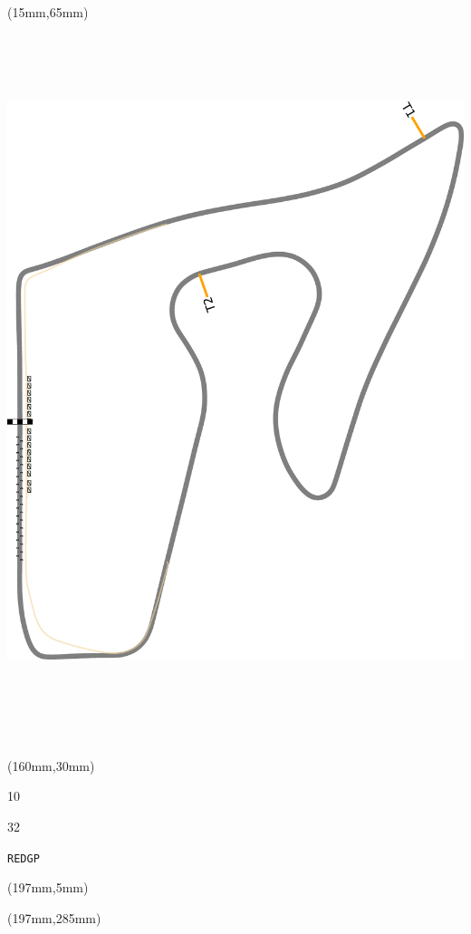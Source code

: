 \begin{textblock*}{185mm}(15mm,65mm)%
\centering
\mbox{\includegraphics[width=185mm,height=210mm,keepaspectratio]{PT/REDGP.pdf}}
\end{textblock*}
\begin{textblock*}{40mm}(160mm,30mm)%
\Large
\par{} 
\par10 
\par32 
\par\hfill\tiny\tt REDGP\\
\end{textblock*}
\begin{textblock*}{20mm}(197mm,5mm)%
\fbox{\thepage}
\label{REDGP}
\end{textblock*}
\begin{textblock*}{20mm}(197mm,285mm)%
\fbox{\thepage}
\end{textblock*}

